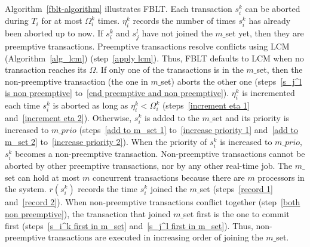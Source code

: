 Algorithm~\ref{fblt-algorithm} illustrates FBLT. Each transaction $s_{i}^{k}$ can be aborted during $T_i$ for at most $\Omega_{i}^{k}$ times. $\eta_{i}^{k}$ records  the number of times $s_{i}^{k}$ has already been aborted up to now. If $s_i^k$ and $s_j^l$ have not joined the $m\_$set yet, then they are preemptive transactions. Preemptive transactions resolve conflicts using LCM (Algorithm~\ref{alg_lcm}) (step~\ref{apply lcm}). Thus, FBLT defaults to LCM when no transaction reaches its $\Omega$. If only one of the transactions is in the $m\_$set, then the non-preemptive transaction (the one in $m\_$set) aborts the other one (steps~\ref{s_j^l is non preemptive} to~\ref{end preemptive and non preemptive}). $\eta_i^k$ is incremented each time $s_i^k$ is aborted as long as $\eta_i^k < \Omega_i^k$ (steps~\ref{increment eta 1} and~\ref{increment eta 2}). Otherwise, $s_i^k$ is added to the $m\_$set and its priority is increased to $m\_prio$ (steps~\ref{add to m_set 1} to~\ref{increase priority 1} and~\ref{add to m_set 2} to~\ref{increase priority 2}). When the priority of $s_i^k$ is increased to $m\_prio$, $s_i^k$ becomes a non-preemptive transaction. Non-preemptive transactions cannot be aborted by other preemptive transactions, nor by any other real-time job. The $m\_$set can hold at most $m$ concurrent transactions because there are $m$ processors in the system. $r(s_i^k)$ records the time $s_i^k$ joined the $m\_$set (steps~\ref{record 1} and~\ref{record 2}). When non-preemptive transactions conflict together (step~\ref{both non preemptive}), the transaction that joined $m\_$set first is the one to commit first (steps~\ref{s_i^k first in m_set} and~\ref{s_j^l first in m_set}). Thus, non-preemptive transactions are executed in increasing order of joining the $m\_$set.
%

